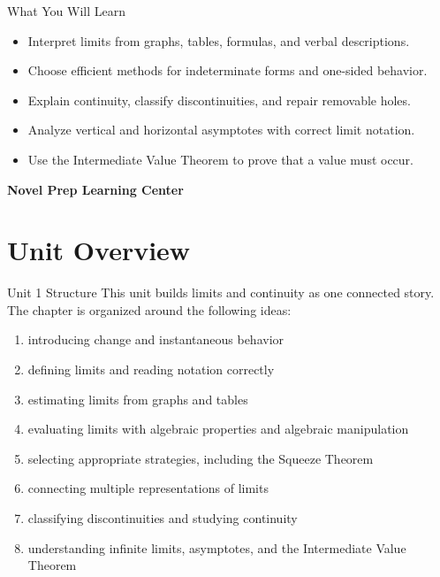 \documentclass[11pt]{article}
\begin{document}
\begin{titlepage}
\begin{minipage}{0.83\textwidth}
\begin{notebox}{What You Will Learn}
\begin{itemize}
    \item Interpret limits from graphs, tables, formulas, and verbal descriptions.
    \item Choose efficient methods for indeterminate forms and one-sided behavior.
    \item Explain continuity, classify discontinuities, and repair removable holes.
    \item Analyze vertical and horizontal asymptotes with correct limit notation.
    \item Use the Intermediate Value Theorem to prove that a value must occur.
\end{itemize}
\end{notebox}
\end{minipage}

\vfill

{\large\textbf{Novel Prep Learning Center}}\\[0.25em]

\end{titlepage}

\clearpage
\thispagestyle{fancy}
\tableofcontents
\newpage

%
%
%
\section*{Unit Overview}

\begin{skillbox}{Unit 1 Structure}
This unit builds limits and continuity as one connected story. The chapter is organized around the following ideas:
\begin{enumerate}
    \item introducing change and instantaneous behavior
    \item defining limits and reading notation correctly
    \item estimating limits from graphs and tables
    \item evaluating limits with algebraic properties and algebraic manipulation
    \item selecting appropriate strategies, including the Squeeze Theorem
    \item connecting multiple representations of limits
    \item classifying discontinuities and studying continuity
    \item understanding infinite limits, asymptotes, and the Intermediate Value Theorem
\end{enumerate}
\end{skillbox}
\end{document}
